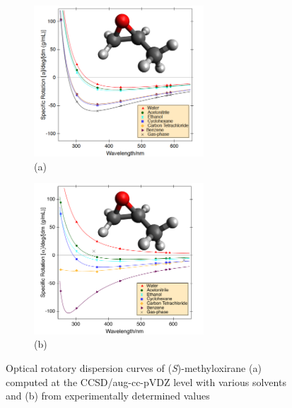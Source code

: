 \begin{figure}
\begin{subfigure}{.45\textwidth}
\includegraphics[width=2.5in]{figs/fig1a.pdf}
\caption*{\hspace{-1.25em}(a)}
\end{subfigure}
\hfill
\begin{subfigure}{.45\textwidth}
\includegraphics[width=2.5in]{figs/fig1b.pdf}
\caption*{\hspace{-1.25em}(b)}
\end{subfigure}
\caption{Optical rotatory dispersion curves of (\emph{S})-methyloxirane
(a) computed at the CCSD/aug-cc-pVDZ level with various solvents
and (b) from experimentally determined values\cite{Wilson:05}
}
\label{fig:smo}
\end{figure}

